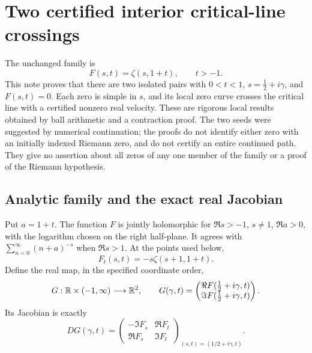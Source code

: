 
\section{Two certified interior critical-line crossings}

\noindent
The unchanged family is
\[
 F(s,t)=\zeta(s,1+t),\qquad t>-1.
\]
This note proves that there are two isolated pairs with \(0<t<1\),
\(s=\tfrac12+i\gamma\), and \(F(s,t)=0\). Each zero is simple in
\(s\), and its local zero curve crosses the critical line with a certified
nonzero real velocity. These are rigorous local results obtained by ball
arithmetic and a contraction proof. The two seeds were suggested by
numerical continuation; the proofs do not identify either zero with an
initially indexed Riemann zero, and do not certify an entire continued
path. They give no assertion about all zeros of any one member of the
family or a proof of the Riemann hypothesis.

\subsection{Analytic family and the exact real Jacobian}

\begin{hxctheorem}\label{hxc:analytic}
Put \(a=1+t\). The function \(F\) is jointly holomorphic for
\(\Re s>-1\), \(s\ne1\), \(\Re a>0\), with the logarithm chosen on
the right half-plane. It agrees with \(\sum_{n=0}^\infty(n+a)^{-s}\)
when \(\Re s>1\). At the points used below,
\begin{equation}\label{hxc:flow}
 F_t(s,t)=-s\zeta(s+1,1+t).
\end{equation}
Define the real map, in the specified coordinate order,
\[
 G:\mathbb R\times(-1,\infty)\longrightarrow\mathbb R^2,
 \qquad
 G(\gamma,t)=
 \begin{pmatrix}\Re F(\tfrac12+i\gamma,t)\\
                 \Im F(\tfrac12+i\gamma,t)\end{pmatrix}.
\]
Its Jacobian is exactly
\begin{equation}\label{hxc:jacobian}
 DG(\gamma,t)=
 \begin{pmatrix}
 -\Im F_s&\Re F_t\\
 \Re F_s&\Im F_t
 \end{pmatrix}_{(s,t)=(1/2+i\gamma,t)}.
\end{equation}
\end{hxctheorem}

